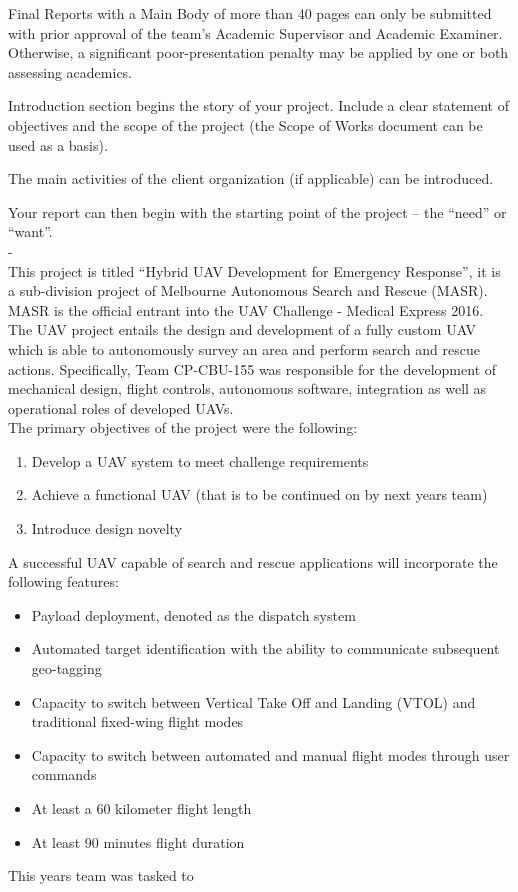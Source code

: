 Final Reports with a Main Body of more than 40 pages can only be submitted with prior approval of the team’s Academic Supervisor and Academic Examiner.  Otherwise, a significant poor-presentation penalty may be applied by one or both assessing academics.

Introduction section begins the story of your project.  Include a clear statement of objectives and the scope of the project (the Scope of Works document can be used as a basis).

The main activities of the client organization (if applicable) can be introduced.

Your report can then begin with the starting point of the project – the “need” or “want”. \\

-\\

This project is titled ``Hybrid UAV Development for Emergency Response'', it is a sub-division project of Melbourne Autonomous Search and Rescue (MASR). MASR is the official entrant into the UAV  Challenge - Medical Express 2016.\\

The UAV project entails the design and development of a fully custom UAV which is able to autonomously survey an area and perform search and rescue actions. Specifically, Team CP-CBU-155 was responsible for the development of mechanical design, flight controls, autonomous software, integration as well as operational roles of developed UAVs.\\

The primary objectives of the project were the following:

\begin{enumerate}
	\item Develop a UAV system to meet challenge requirements
	\item Achieve a functional UAV (that is to be continued on by next years team)
	\item Introduce design novelty \\
\end{enumerate}

A successful UAV capable of search and rescue applications will incorporate the following features:
\begin{itemize}
	\item Payload deployment, denoted as the dispatch system
	\item Automated target identification with the ability to communicate subsequent geo-tagging
	\item Capacity to switch between Vertical Take Off and Landing (VTOL) and traditional fixed-wing flight modes
	\item Capacity to switch between automated and manual flight modes through user commands
	\item At least a 60 kilometer flight length
	\item At least 90 minutes flight duration\\
\end{itemize}

This years team was tasked to 

